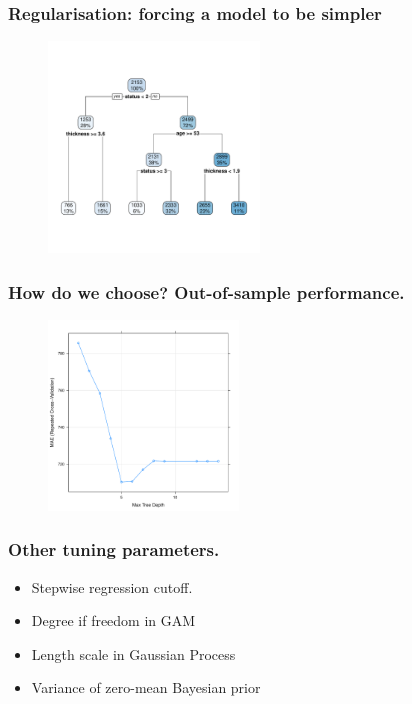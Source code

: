 \documentclass[handout, aspectratio = 169]{beamer}
\begin{document}
\begin{frame}
\frametitle{Regularisation: forcing a model to be simpler}
\vspace{-4mm}
\begin{figure}
    \includegraphics[width = 0.5\textwidth]{rpart_depth3.pdf}
\end{figure} 
\end{frame} 





\begin{frame}
\frametitle{How do we choose? Out-of-sample performance.}
\vspace{-4mm}
\begin{figure}
    \includegraphics[width = 0.45\textwidth]{rpart_perf.pdf}
\end{figure} 

\end{frame} 


\begin{frame}
\frametitle{Other tuning parameters.}
\begin{itemize}
\item Stepwise regression cutoff.
\item Degree if freedom in GAM
\item Length scale in Gaussian Process
\item Variance of zero-mean Bayesian prior
\end{itemize}

\end{frame} 
\end{document}
